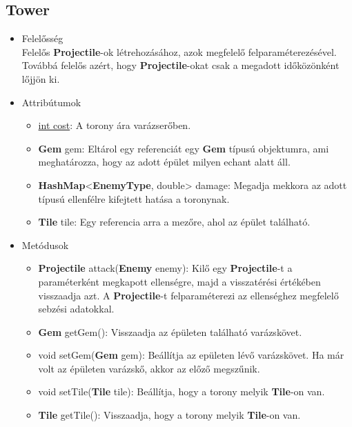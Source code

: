 \subsection{Tower}
\begin{itemize}
\item Felelősség\\
Felelős \textbf{Projectile}-ok létrehozásához, azok megfelelő felparaméterezésével. Továbbá felelős azért, hogy \textbf{Projectile}-okat csak a megadott időközönként lőjjön ki.
\item Attribútumok
	\begin{itemize}
		\item \underline{int cost}: A torony ára varázserőben.
		\item \textbf{Gem} gem: Eltárol egy referenciát egy \textbf{Gem} típusú objektumra, ami meghatározza, hogy az adott épület milyen echant alatt áll.
		\item \textbf{HashMap}<\textbf{EnemyType}, double> damage: Megadja mekkora az adott típusú ellenfélre kifejtett hatása a toronynak.
		\item \textbf{Tile} tile: Egy referencia arra a mezőre, ahol az épület található.
	\end{itemize}
\item Metódusok
	\begin{itemize}
		\item \textbf{Projectile} attack(\textbf{Enemy} enemy): Kilő egy \textbf{Projectile}-t a paraméterként megkapott ellenségre, majd a visszatérési értékében visszaadja azt. A \textbf{Projectile}-t felparaméterezi az ellenséghez megfelelő sebzési adatokkal.
		\item \textbf{Gem} getGem(): Visszaadja az épületen található varázskövet.
		\item void setGem(\textbf{Gem} gem): Beállítja az epületen lévő varázskövet. Ha már volt az épületen varázskő, akkor az előző megszűnik.
		\item void setTile(\textbf{Tile} tile): Beállítja, hogy a torony melyik \textbf{Tile}-on van.
		\item \textbf{Tile} getTile(): Visszaadja, hogy a torony melyik \textbf{Tile}-on van.
	\end{itemize}
\end{itemize}


